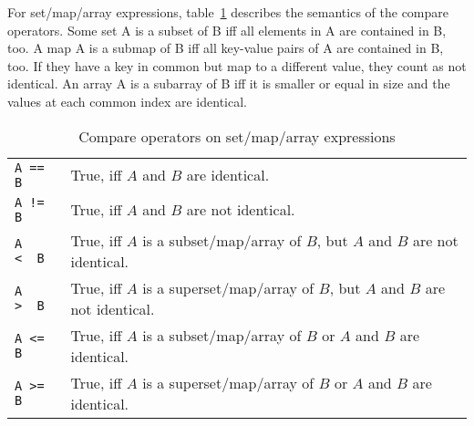 For set/map/array expressions, table~\ref{compandsetmap} describes the semantics of the compare operators.
Some set A is a subset of B iff all elements in A are contained in B, too.
A map A is a submap of B iff all key-value pairs of A are contained in B, too. If they have a key in common but map to a different value, they count as not identical.
An array A is a subarray of B iff it is smaller or equal in size and the values at each common index are identical.
\begin{table}[htbp]
  \centering
  \begin{tabularx}{\linewidth}{|l|X|} \hline
    \texttt{A == B} & True, iff $A$ and $B$ are identical. \\
    \texttt{A != B} & True, iff $A$ and $B$ are not identical. \\
    \texttt{A <\ \ B} & True, iff $A$ is a subset/map/array of $B$, but $A$ and $B$ are not identical. \\
    \texttt{A >\ \ B} & True, iff $A$ is a superset/map/array of $B$, but $A$ and $B$ are not identical. \\
    \texttt{A <= B} & True, iff $A$ is a subset/map/array of $B$ or $A$ and $B$ are identical. \\
    \texttt{A >= B} & True, iff $A$ is a superset/map/array of $B$ or $A$ and $B$ are identical. \\ \hline
  \end{tabularx}
  \caption{Compare operators on set/map/array expressions}
  \label{compandsetmap}
\end{table}

